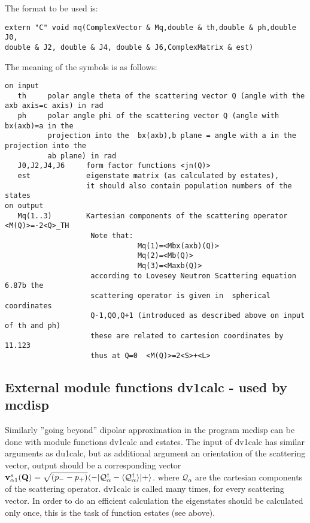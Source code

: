 The format to be used is:
{\footnotesize
\begin{verbatim}
extern "C" void mq(ComplexVector & Mq,double & th,double & ph,double J0,
double & J2, double & J4, double & J6,ComplexMatrix & est)
\end{verbatim}

The meaning of the symbols is as follows:

\begin{verbatim}
on input
   th     polar angle theta of the scattering vector Q (angle with the axb axis=c axis) in rad
   ph     polar angle phi of the scattering vector Q (angle with bx(axb)=a in the 
          projection into the  bx(axb),b plane = angle with a in the projection into the 
		  ab plane) in rad
   J0,J2,J4,J6     form factor functions <jn(Q)>   
   est             eigenstate matrix (as calculated by estates),
                   it should also contain population numbers of the states
on output
   Mq(1..3)        Kartesian components of the scattering operator <M(Q)>=-2<Q>_TH
                    Note that: 
                               Mq(1)=<Mbx(axb)(Q)>
                               Mq(2)=<Mb(Q)>
                               Mq(3)=<Maxb(Q)>
                    according to Lovesey Neutron Scattering equation 6.87b the 
                    scattering operator is given in  spherical coordinates 
					Q-1,Q0,Q+1 (introduced as described above on input of th and ph)
					these are related to cartesion coordinates by 11.123
				    thus at Q=0  <M(Q)>=2<S>+<L>

\end{verbatim}
}

\subsection{External module functions {\prg dv1calc} - used by {\prg mcdisp}  }

Similarly  ''going beyond''  dipolar approximation in the program {\prg mcdisp}
can be done with  module functions {\prg dv1calc} and {\prg estates}. 
The input of {\prg dv1calc} 
has similar arguments as
{\prg du1calc}, but as additional argument an orientation
of the scattering vector,
output should be a corresponding vector
 ${\mathbf v^s_{\alpha1}}(\mathbf Q)=\sqrt{(p_--p_+)}
\langle -|\mathcal Q^{\dag}_{\alpha}-\langle \mathcal Q^{\dag}_{\alpha}\rangle|+\rangle$.
where $\mathcal Q_{\alpha}$ are the cartesian components of the scattering operator.
 {\prg dv1calc} is called many times, for
 every scattering vector. In order to
 do an efficient calculation the eigenstates should be calculated only
 once, this is the task of function {\prg estates} (see above).


